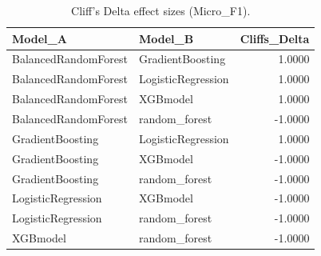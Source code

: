\begin{table}[t]
\centering
\begin{tabular}{llr}
\toprule
Model_A & Model_B & Cliffs_Delta \\
\midrule
BalancedRandomForest & GradientBoosting & 1.0000 \\
BalancedRandomForest & LogisticRegression & 1.0000 \\
BalancedRandomForest & XGBmodel & 1.0000 \\
BalancedRandomForest & random_forest & -1.0000 \\
GradientBoosting & LogisticRegression & 1.0000 \\
GradientBoosting & XGBmodel & -1.0000 \\
GradientBoosting & random_forest & -1.0000 \\
LogisticRegression & XGBmodel & -1.0000 \\
LogisticRegression & random_forest & -1.0000 \\
XGBmodel & random_forest & -1.0000 \\
\bottomrule
\end{tabular}
\caption{Cliff's Delta effect sizes (Micro_F1).}
\label{tab:cliffs_Micro_F1}
\end{table}